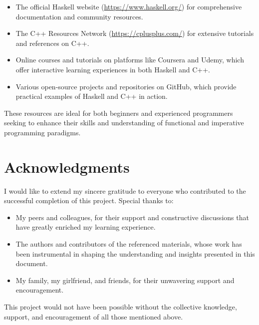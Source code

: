\documentclass[a4paper, 10pt]{article}
\begin{document}
        \begin{itemize}
            \item The official Haskell website (\url{https://www.haskell.org/}) for comprehensive documentation and community resources.
            \item The C++ Resources Network (\url{https://cplusplus.com/}) for extensive tutorials and references on C++.
            \item Online courses and tutorials on platforms like Coursera and Udemy, which offer interactive learning experiences in both Haskell and C++.
            \item Various open-source projects and repositories on GitHub, which provide practical examples of Haskell and C++ in action.
        \end{itemize}

        \noindent These resources are ideal for both beginners and experienced programmers seeking to enhance their skills and understanding of functional and imperative programming paradigms.

	\section{Acknowledgments}
        I would like to extend my sincere gratitude to everyone who contributed to the successful completion of this project. Special thanks to:

        \begin{itemize}
            \item My peers and colleagues, for their support and constructive discussions that have greatly enriched my learning experience.
            \item The authors and contributors of the referenced materials, whose work has been instrumental in shaping the understanding and insights presented in this document.
            \item My family, my girlfriend, and friends, for their unwavering support and encouragement.
        \end{itemize}

        \noindent This project would not have been possible without the collective knowledge, support, and encouragement of all those mentioned above.
\end{document}
